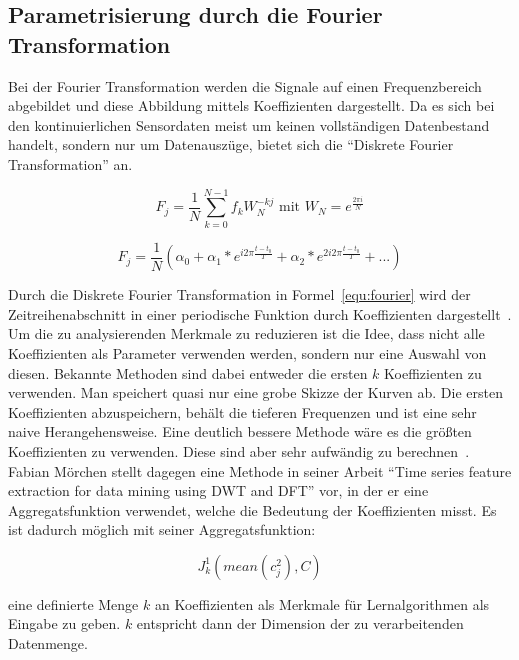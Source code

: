 \subsection{Parametrisierung durch die Fourier Transformation}

Bei der Fourier Transformation werden die Signale auf einen Frequenzbereich abgebildet und diese Abbildung mittels Koeffizienten dargestellt. Da es sich bei den kontinuierlichen Sensordaten meist um keinen vollständigen Datenbestand handelt, sondern nur um Datenauszüge, bietet sich die \enquote{Diskrete Fourier Transformation} an.


\begin{equation}
  F_j = \frac{1}{N} \sum_{k=0}^{N-1} f_k W_N^{-kj}  \text{\ \ mit \ \ } W_N = e^{\frac{2\pi i}{N}}
  \label{equ:fourier}
\end{equation}

\begin{equation}
  F_j = \frac{1}{N} (\alpha_0+\alpha_1*e^{i2\pi \frac{t-t_0}{T}}+ \alpha_2*e^{2i2\pi \frac{t-t_0}{T}} + ...)
  \label{equ:fourier}
\end{equation}

Durch die Diskrete Fourier Transformation in Formel\ \ref{equ:fourier} wird der Zeitreihenabschnitt in einer periodische Funktion durch Koeffizienten dargestellt~\cite{Butz2012}. Um die zu analysierenden Merkmale zu reduzieren ist die Idee, dass nicht alle Koeffizienten als Parameter verwenden werden, sondern nur eine Auswahl von diesen. Bekannte Methoden sind dabei entweder die ersten $k$ Koeffizienten zu verwenden. Man speichert quasi nur eine grobe Skizze der Kurven ab. Die ersten Koeffizienten abzuspeichern, behält die tieferen Frequenzen und ist eine sehr naive Herangehensweise. Eine deutlich bessere Methode wäre es die größten Koeffizienten zu verwenden. Diese sind aber sehr aufwändig zu berechnen~\cite{morchen2003time}. Fabian Mörchen stellt dagegen eine Methode in seiner Arbeit \enquote{Time series feature extraction for data mining using DWT and DFT} vor, in der er eine Aggregatsfunktion verwendet, welche die Bedeutung der Koeffizienten misst. Es ist dadurch möglich mit seiner Aggregatsfunktion:

\begin{equation}
  J_k^1(mean(c_j^2), C)
  \label{equ:aggregatefunction}
\end{equation}

eine definierte Menge $k$ an Koeffizienten als Merkmale für Lernalgorithmen als Eingabe zu geben. $k$ entspricht dann der Dimension der zu verarbeitenden Datenmenge. 

